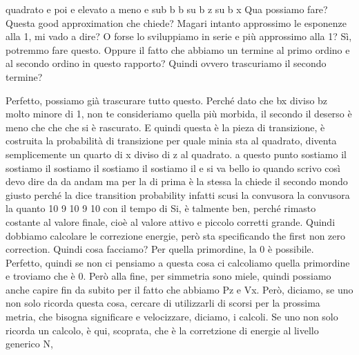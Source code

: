 \begin{soluzione}
quadrato e poi e elevato a meno e sub b b su b z su b x Qua possiamo fare? Questa good approximation che chiede? Magari intanto approssimo le esponenze alla 1, mi vado a dire? O forse lo sviluppiamo in serie e più approssimo alla 1? Sì, potremmo fare questo. Oppure il fatto che abbiamo un termine al primo ordino e al secondo ordino in questo rapporto? Quindi ovvero trascuriamo il secondo termine?
   
   Perfetto, possiamo già trascurare tutto questo. Perché dato che bx diviso bz molto minore di 1, non te consideriamo quella più morbida, il secondo il deserso è meno che che che si è rascurato. E quindi questa è la pieza di transizione, è costruita la probabilità di transizione per quale minia sta al quadrato, diventa semplicemente un quarto di x diviso di z al quadrato. a questo punto sostiamo il sostiamo il sostiamo il sostiamo il sostiamo il e si va bello io quando scrivo così devo dire da da andam ma per la di prima è la stessa la chiede il secondo mondo giusto perché la dice transition probability infatti scusi la convusora la convusora la quanto 10 9 10 9 10 con il tempo di Si, è talmente ben, perché rimasto costante al valore finale, cioè al valore attivo e piccolo corretti grande. Quindi dobbiamo calcolare le correzione energie, però sta specificando the first non zero correction. Quindi cosa facciamo? Per quella primordine, la 0 è possibile. Perfetto, quindi se non ci pensiamo a questa cosa ci calcoliamo quella primordine e troviamo che è 0. Però alla fine, per simmetria sono miele, quindi possiamo anche capire fin da subito per il fatto che abbiamo Pz e Vx. Però, diciamo, se uno non solo ricorda questa cosa, cercare di utilizzarli di scorsi per la prossima metria, che bisogna significare e velocizzare, diciamo, i calcoli. Se uno non solo ricorda un calcolo, è qui, scoprata, che è la corretzione di energie al livello generico N,
   

\end{soluzione}
